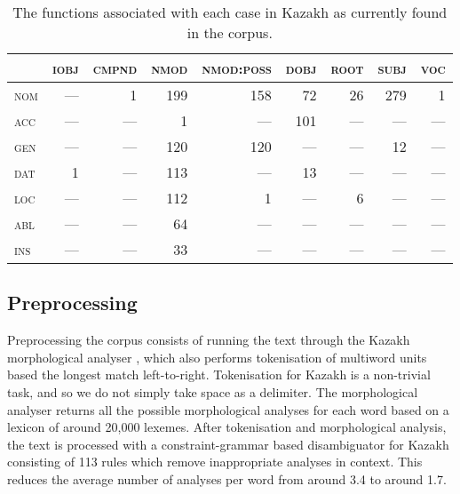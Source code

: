 \documentclass[a4paper,11pt, onecolumn,twoside]{article}
\newcommand{\gmk}[1]{{\rm {\ll \textsc{#1}}}}
\newcommand{\udtag}[1]{{\ll \textsc{#1}}}
\begin{document}
\begin{table}[htbp]
	\centering
	\caption{The functions associated with each case in Kazakh as currently found in the corpus.}
	\label{tab:casefunc}
	\begin{tabular}{lrrrrrrrr}
		\toprule
			 & \udtag{iobj} & \udtag{cmpnd} & \udtag{nmod} & \udtag{nmod:poss} & \udtag{dobj} & \udtag{root} & \udtag{subj} & \udtag{voc} \\
		\midrule
			\gmk{nom} & — & 1 & 199 & 158 & 72 & 26 & 279 & 1 \\
			\gmk{acc} & — & — & 1 & — & 101 & — & — & — \\
			\gmk{gen} & — & — & 120 & 120 & — & — & 12 & — \\
			\gmk{dat} & 1 & — & 113 & — & 13 & — & — & — \\
			\gmk{loc} & — & — & 112 & 1 & — & 6 & — & — \\
			\gmk{abl} & — & — & 64 & — & — & — & — & — \\
			\gmk{ins} & — & — & 33 & — & — & — & — & — \\
		\bottomrule
	\end{tabular}
\end{table}
\vspace{-0.75em}


\subsection{Preprocessing}


Preprocessing the corpus consists of running the text through the Kazakh morphological
analyser \parencite{Washington14}, which also performs tokenisation of multiword units based 
the longest match left-to-right. Tokenisation for Kazakh is a non-trivial task, and so
we do not simply take space as a delimiter. The morphological analyser returns all 
the possible morphological analyses for each word based on a lexicon of around 20,000 lexemes.
After tokenisation and morphological analysis, the text is processed with a constraint-grammar 
based disambiguator for Kazakh consisting of 113 rules which remove inappropriate 
analyses in context. This reduces the average number of analyses per word from around 3.4
to around 1.7.
\end{document}
